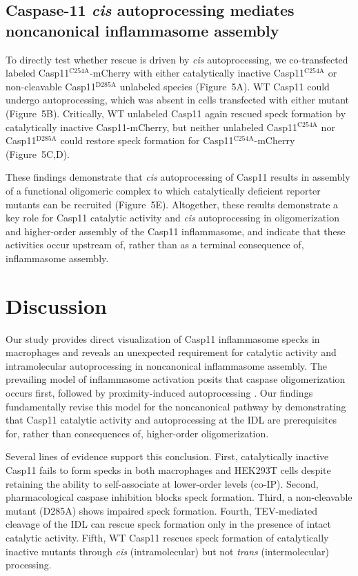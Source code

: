 \documentclass[11pt]{article}
\begin{document}
\subsection{Caspase-11 \textit{cis} autoprocessing mediates noncanonical inflammasome assembly}

To directly test whether rescue is driven by \textit{cis} autoprocessing, we co-transfected labeled Casp11$^{\text{C254A}}$-mCherry with either catalytically inactive Casp11$^{\text{C254A}}$ or non-cleavable Casp11$^{\text{D285A}}$ unlabeled species (Figure~5A). WT Casp11 could undergo autoprocessing, which was absent in cells transfected with either mutant (Figure~5B). Critically, WT unlabeled Casp11 again rescued speck formation by catalytically inactive Casp11-mCherry, but neither unlabeled Casp11$^{\text{C254A}}$ nor Casp11$^{\text{D285A}}$ could restore speck formation for Casp11$^{\text{C254A}}$-mCherry (Figure~5C,D).

These findings demonstrate that \textit{cis} autoprocessing of Casp11 results in assembly of a functional oligomeric complex to which catalytically deficient reporter mutants can be recruited (Figure~5E). Altogether, these results demonstrate a key role for Casp11 catalytic activity and \textit{cis} autoprocessing in oligomerization and higher-order assembly of the Casp11 inflammasome, and indicate that these activities occur upstream of, rather than as a terminal consequence of, inflammasome assembly.

\section{Discussion}

Our study provides direct visualization of Casp11 inflammasome specks in macrophages and reveals an unexpected requirement for catalytic activity and intramolecular autoprocessing in noncanonical inflammasome assembly. The prevailing model of inflammasome activation posits that caspase oligomerization occurs first, followed by proximity-induced autoprocessing \citep{martinon2009,kagan2014}. Our findings fundamentally revise this model for the noncanonical pathway by demonstrating that Casp11 catalytic activity and autoprocessing at the IDL are prerequisites for, rather than consequences of, higher-order oligomerization.

Several lines of evidence support this conclusion. First, catalytically inactive Casp11 fails to form specks in both macrophages and HEK293T cells despite retaining the ability to self-associate at lower-order levels (co-IP). Second, pharmacological caspase inhibition blocks speck formation. Third, a non-cleavable mutant (D285A) shows impaired speck formation. Fourth, TEV-mediated cleavage of the IDL can rescue speck formation only in the presence of intact catalytic activity. Fifth, WT Casp11 rescues speck formation of catalytically inactive mutants through \textit{cis} (intramolecular) but not \textit{trans} (intermolecular) processing.
\end{document}
